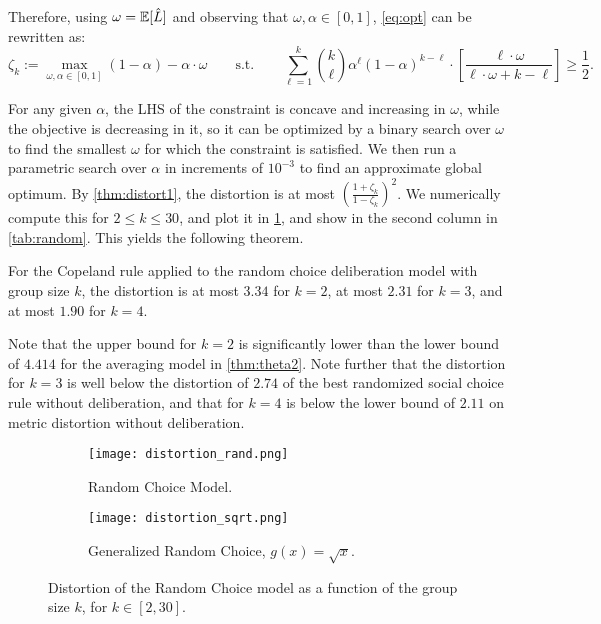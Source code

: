 Therefore, using $\omega = \mathbb{E}[\hat{L}]$ and observing that $\omega, \alpha \in [0,1]$, \cref{eq:opt} can be rewritten as:
\begin{equation} 
\label{eq:opt2}
\zeta_k := \max_{\omega, \alpha \in [0,1]} (1-\alpha) - \alpha \cdot \omega \qquad \mbox{s.t.} \qquad %
\sum_{\ell = 1}^k {k \choose \ell} \alpha^{\ell} (1-\alpha)^{k-\ell} \cdot
\left[ \frac{\ell \cdot \omega}{\ell \cdot \omega + k-\ell } \right] \ge \frac{1}{2}.
\end{equation}

For any given $\alpha$, the LHS of the constraint is concave and increasing in $\omega$, while the objective is decreasing in it, so it can be optimized by a binary search over $\omega$ to find the smallest $\omega$ for which the constraint is satisfied. We then run a parametric search over $\alpha$ in increments of $10^{-3}$ to find an approximate global optimum. By \cref{thm:distort1}, the distortion is at most $\left(\frac{1+\zeta_k}{1-\zeta_k}\right)^2$. We numerically compute this for $2 \le k \le 30$, and plot it in \cref{fig1}, and show in the second column in \cref{tab:random}. This yields the following theorem.

\begin{theorem}
\label{thm:random}
    For the Copeland rule applied to the random choice deliberation model with group size $k$, the distortion is at most $3.34$ for $k = 2$, at most $2.31$ for $k = 3$, and at most $1.90$ for $k = 4$.
\end{theorem}

Note that the upper bound for $k = 2$ is significantly lower than the lower bound of $4.414$ for the averaging model in \cref{thm:theta2}. Note further that the distortion for $k = 3$ is well below the distortion of $2.74$ of the best randomized social choice rule without deliberation, and that for $k = 4$ is below the lower bound of $2.11$ on metric distortion without deliberation. %

\begin{figure*}[htbp]
    \centering
    \begin{subfigure}[t]{0.4\textwidth}
        \centering
        \texttt{[image: distortion\_rand.png]}
        \caption{\label{fig1} Random Choice Model.}
    \end{subfigure}
    \qquad
        \begin{subfigure}[t]{0.4\textwidth}
        \centering
        \texttt{[image: distortion\_sqrt.png]}
        \caption{\label{fig2} Generalized Random Choice, $g(x) = \sqrt{x}$.}
    \end{subfigure}
    \caption{Distortion of the Random Choice model as a function of the group size $k$, for $k \in [2,30]$.}
\end{figure*}


